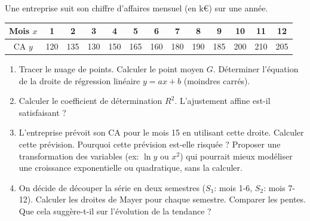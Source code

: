 \documentclass[11pt]{article}
\begin{document}
\begin{exercice}
Une entreprise suit son chiffre d'affaires mensuel (en k€) sur une année.
\begin{center}
\begin{tabular}{|c|c|c|c|c|c|c|c|c|c|c|c|c|}
\hline
Mois $x$ & 1 & 2 & 3 & 4 & 5 & 6 & 7 & 8 & 9 & 10 & 11 & 12 \\
\hline
CA $y$ & 120 & 135 & 130 & 150 & 165 & 160 & 180 & 190 & 185 & 200 & 210 & 205 \\
\hline
\end{tabular}
\end{center}
\begin{enumerate}
    \item Tracer le nuage de points. Calculer le point moyen $G$. Déterminer l'équation de la droite de régression linéaire $y = ax + b$ (moindres carrés).
    \item Calculer le coefficient de détermination $R^2$. L'ajustement affine est-il satisfaisant ?
    \item L'entreprise prévoit son CA pour le mois 15 en utilisant cette droite. Calculer cette prévision. Pourquoi cette prévision est-elle risquée ? Proposer une transformation des variables (ex: $\ln y$ ou $x^2$) qui pourrait mieux modéliser une croissance exponentielle ou quadratique, sans la calculer.
    \item On décide de découper la série en deux semestres ($S_1$: mois 1-6, $S_2$: mois 7-12). Calculer les droites de Mayer pour chaque semestre. Comparer les pentes. Que cela suggère-t-il sur l'évolution de la tendance ?
\end{enumerate}
\end{exercice}
\end{document}
